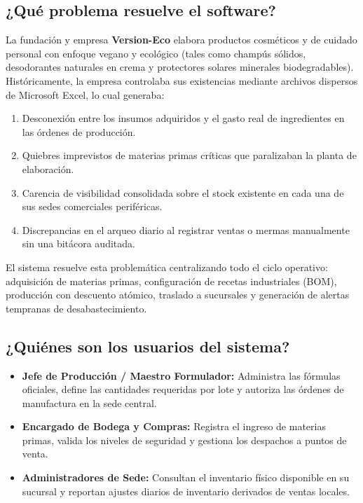 \documentclass[11pt,a4paper]{article}
\begin{document}
\subsection{¿Qué problema resuelve el software?}
La fundación y empresa \textbf{Version-Eco} elabora productos cosméticos y de cuidado personal con enfoque vegano y ecológico (tales como champús sólidos, desodorantes naturales en crema y protectores solares minerales biodegradables). Históricamente, la empresa controlaba sus existencias mediante archivos dispersos de Microsoft Excel, lo cual generaba:
\begin{enumerate}
    \item Desconexión entre los insumos adquiridos y el gasto real de ingredientes en las órdenes de producción.
    \item Quiebres imprevistos de materias primas críticas que paralizaban la planta de elaboración.
    \item Carencia de visibilidad consolidada sobre el stock existente en cada una de sus sedes comerciales periféricas.
    \item Discrepancias en el arqueo diario al registrar ventas o mermas manualmente sin una bitácora auditada.
\end{enumerate}
El sistema resuelve esta problemática centralizando todo el ciclo operativo: adquisición de materias primas, configuración de recetas industriales (BOM), producción con descuento atómico, traslado a sucursales y generación de alertas tempranas de desabastecimiento.

\subsection{¿Quiénes son los usuarios del sistema?}
\begin{itemize}
    \item \textbf{Jefe de Producción / Maestro Formulador:} Administra las fórmulas oficiales, define las cantidades requeridas por lote y autoriza las órdenes de manufactura en la sede central.
    \item \textbf{Encargado de Bodega y Compras:} Registra el ingreso de materias primas, valida los niveles de seguridad y gestiona los despachos a puntos de venta.
    \item \textbf{Administradores de Sede:} Consultan el inventario físico disponible en su sucursal y reportan ajustes diarios de inventario derivados de ventas locales.
\end{itemize}
\end{document}

